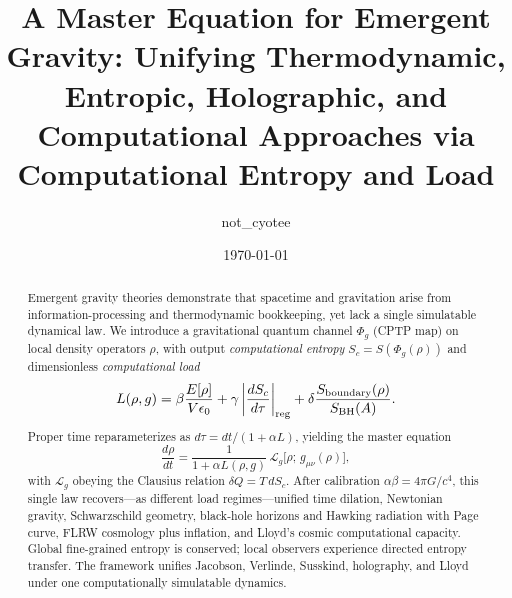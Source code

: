 \documentclass[reprint,amsmath,amssymb,aps,prd,preprintnumbers,superscriptaddress,longbibliography,10pt]{revtex4-2}
\begin{document}
\title{A Master Equation for Emergent Gravity: Unifying Thermodynamic, Entropic, Holographic, and Computational Approaches via Computational Entropy and Load}

\author{not\_cyotee}

\date{\today}

\begin{abstract}
Emergent gravity theories demonstrate that spacetime and gravitation arise from information-processing and thermodynamic bookkeeping, yet lack a single simulatable dynamical law. We introduce a gravitational quantum channel \(\Phi_g\) (CPTP map) on local density operators \(\rho\), with output \emph{computational entropy} \(S_c = S(\Phi_g(\rho))\) and dimensionless \emph{computational load}
\[
L(\rho,g) = \beta \frac{E[\rho]}{V \epsilon_0} + \gamma \left| \frac{d S_c}{d\tau} \right|_{\rm reg} + \delta \frac{S_{\rm boundary}(\rho)}{S_{\rm BH}(A)}.
\]
Proper time reparameterizes as \(d\tau = dt / (1 + \alpha L)\), yielding the master equation
\[
\frac{d\rho}{dt} = \frac{1}{1 + \alpha L(\rho,g)} \,\mathcal{L}_g\bigl[\rho;\, g_{\mu\nu}(\rho)\bigr],
\]
with \(\mathcal{L}_g\) obeying the Clausius relation \(\delta Q = T\, dS_c\). After calibration \(\alpha\beta = 4\pi G/c^4\), this single law recovers---as different load regimes---unified time dilation, Newtonian gravity, Schwarzschild geometry, black-hole horizons and Hawking radiation with Page curve, FLRW cosmology plus inflation, and Lloyd's cosmic computational capacity. Global fine-grained entropy is conserved; local observers experience directed entropy transfer. The framework unifies Jacobson, Verlinde, Susskind, holography, and Lloyd under one computationally simulatable dynamics.
\end{abstract}

\maketitle
\end{document}

